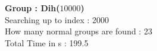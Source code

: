 \textbf{Group : Dih($10000$)}\\
Searching up to index : 2000\\
How many normal groups are found : 23\\
Total Time in s : 199.5\\
